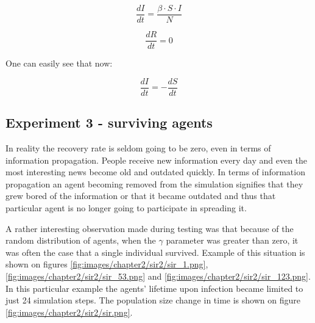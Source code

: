 \begin{equation} \label{eq:sir2_gamma0}
    \frac{{dI}}{{dt}} = \frac{{\beta \cdot S \cdot I}}{{N}}
\end{equation}

\begin{equation} \label{eq:sir3_gamma0}
    \frac{{dR}}{{dt}} = 0
\end{equation}

One can easily see that now:

\begin{equation}
    \frac{{dI}}{{dt}} = -\frac{{dS}}{{dt}}
\end{equation}

\subsection{Experiment 3 - surviving agents}

In reality the recovery rate is seldom going to be zero, even in terms of information propagation.
People receive new information every day and even the most interesting news become old and outdated quickly.
In terms of information propagation an agent becoming removed from the simulation signifies that they grew bored of the information or that it became outdated and thus that particular agent is no longer going to participate in spreading it.


A rather interesting observation made during testing was that because of the random distribution of agents, when the $\gamma$ parameter was greater than zero, it was often the case that a single individual survived.
Example of this situation is shown on figures \ref{fig:images/chapter2/sir2/sir_1.png}, \ref{fig:images/chapter2/sir2/sir_53.png} and \ref{fig:images/chapter2/sir2/sir_123.png}.
In this particular example the agents' lifetime upon infection became limited to just 24 simulation steps.
The population size change in time is shown on figure \ref{fig:images/chapter2/sir2/sir.png}.


